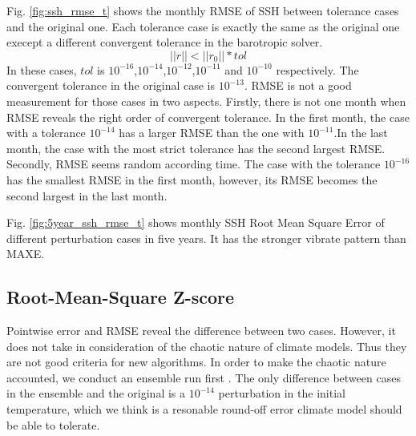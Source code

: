 \documentclass{sig-alternate}
\begin{document}
Fig. \ref{fig:ssh_rmse_t} shows the monthly RMSE of SSH between tolerance cases and the original one. Each tolerance case is exactly the same as the original one execept a different convergent tolerance in the barotropic solver. 
$$||r|| < ||r_0||*tol$$
In these cases, $tol$ is $10^{-16}$,$10^{-14}$,$10^{-12}$,$10^{-11}$ and $10^{-10}$ respectively. The convergent tolerance in the original case is $10^{-13}$.
RMSE is not a good measurement for those cases in two aspects. Firstly, there is not one month when RMSE reveals the right order of convergent tolerance. In the first month, the case with a tolerance $10^{-14}$ has a larger RMSE than the one with $10^{-11}$.In the last month, the case with the most strict tolerance has the second largest RMSE. Secondly, RMSE seems random according time. The case with the tolerance $10^{-16}$ has the smallest RMSE in the first month, however, its RMSE becomes the second largest in the last month.

Fig. \ref{fig:5year_ssh_rmse_t} shows monthly SSH Root Mean Square Error of different perturbation cases in five years. It has the stronger vibrate pattern than MAXE. 

\subsection{Root-Mean-Square Z-score}


Pointwise error and RMSE reveal the difference between two cases. However, it does not take in consideration of the chaotic nature of climate models. Thus they are not good criteria for new algorithms. In order to make the chaotic nature accounted, we conduct an ensemble run first \cite{baker2014methodology}. The only difference between cases in the ensemble and the original is a $10^{-14}$ perturbation in the initial temperature, which we think is a resonable round-off error climate model should be able to tolerate. \\
\end{document}

